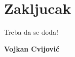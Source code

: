 \documentclass[12pt,oneside]{memoir}
\begin{document}
\chapter{Zakljucak}
Treba da se doda!
\literatura

\backmatter

\begin{biografija}
  \textbf{Vojkan Cvijović}
\end{biografija}
\end{document}
